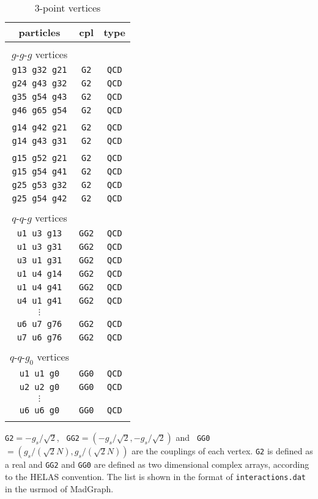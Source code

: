  \begin{table}
 \centering
\caption{3-point vertices}
\label{3}
\begin{tabular}{ccc}
\hline
\hline
particles&cpl&type\\
\hline\\
$g$-$g$-$g$ vertices&&\\
{\tt g13 g32 g21}&{\tt G2}&{\tt QCD}\\
{\tt g24 g43 g32}&{\tt G2}&{\tt QCD}\\
{\tt g35 g54 g43}&{\tt G2}&{\tt QCD}\\
{\tt g46 g65 g54}&{\tt G2}&{\tt QCD}\\\\
{\tt g14 g42 g21}&{\tt G2}&{\tt QCD}\\
{\tt g14 g43 g31}&{\tt G2}&{\tt QCD}\\\\
{\tt g15 g52 g21}&{\tt G2}&{\tt QCD}\\
{\tt g15 g54 g41}&{\tt G2}&{\tt QCD}\\
{\tt g25 g53 g32}&{\tt G2}&{\tt QCD}\\
{\tt g25 g54 g42}&{\tt G2}&{\tt QCD}\\\\

$q$-$q$-$g$ vertices\\
{\tt u1 u3 g13}&{\tt GG2}&{\tt QCD}\\
{\tt u1 u3 g31}&{\tt GG2}&{\tt QCD}\\
{\tt u3 u1 g31}&{\tt GG2}&{\tt QCD}\\
{\tt u1 u4 g14}&{\tt GG2}&{\tt QCD}\\
{\tt u1 u4 g41}&{\tt GG2}&{\tt QCD}\\
{\tt u4 u1 g41}&{\tt GG2}&{\tt QCD}\\
$\vdots$&&\\
{\tt u6 u7 g76}&{\tt GG2}&{\tt QCD}\\
{\tt u7 u6 g76}&{\tt GG2}&{\tt QCD}\\\\
\hspace{1.5em}$q$-$q$-$g_0$ vertices\\
{\tt u1 u1 g0}&{\tt GG0}&{\tt QCD}\\
{\tt u2 u2 g0}&{\tt GG0}&{\tt QCD}\\
$\vdots$&&\\
{\tt u6 u6 g0}&{\tt GG0}&{\tt QCD}\\\\
\hline
\hline
\end{tabular}
 \vspace{0.5em}
  \begin{flushleft}
{\tt G2}$=-g_s/\sqrt{2}$, {\tt
 GG2}$=(-g_s/\sqrt{2},-g_s/\sqrt{2})$ and {\tt
 GG0}$=(g_s/(\sqrt{2}N),g_s/(\sqrt{2}N))$
 are the couplings of each
 vertex. {\tt G2} is defined as a real and {\tt GG2} and {\tt GG0} are
  defined as two dimensional complex arrays, according to the HELAS convention. The list
  is shown in the format of {\tt interactions.dat} in the usrmod of MadGraph\cite{MG/ME}.
  \end{flushleft}
 \label{tb:interactions}
\end{table}

